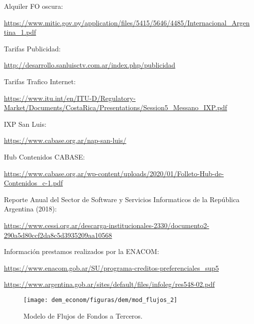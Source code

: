 





\begin{thebibliography}{99}
 Alquiler FO oscura: \begin{tiny}
\url{https://www.mitic.gov.py/application/files/5415/5646/4485/Internacional_Argentina_1.pdf}
\end{tiny}

 Tarifas Publicidad: \begin{tiny}
\url{http://desarrollo.sanluisctv.com.ar/index.php/publicidad}
\end{tiny}

 Tarifas Trafico Internet: \begin{tiny}
\url{https://www.itu.int/en/ITU-D/Regulatory-Market/Documents/CostaRica/Presentations/Session5_Messano_IXP.pdf}
\end{tiny}

 IXP San Luis:
\begin{tiny}
\url{https://www.cabase.org.ar/nap-san-luis/}
\end{tiny}

 Hub Contenidos CABASE:
\begin{tiny}
\url{https://www.cabase.org.ar/wp-content/uploads/2020/01/Folleto-Hub-de-Contenidos_c-1.pdf}
\end{tiny}

 Reporte Anual del Sector de Software y Servicios Informaticos de la República Argentina (2018):


\begin{tiny}
\url{https://www.cessi.org.ar/descarga-institucionales-2330/documento2-290a5d80ccf2da8c5d3935209aa10568}
\end{tiny}

 Información prestamos realizados por la ENACOM:

\begin{tiny}
\url{https://www.enacom.gob.ar/SU/programa-creditos-preferenciales_sup5}
\end{tiny}

\begin{tiny}
\url{https://www.argentina.gob.ar/sites/default/files/infoleg/res548-02.pdf}
\end{tiny}


\end{thebibliography}


 \begin{figure}[H]
	 \centering
	 \texttt{[image: dem\_econom/figuras/dem/mod\_flujos\_2]}
	 \caption{Modelo de Flujos de Fondos a Terceros.}
	 \label{dem-figuras:mod_flujos}

 \end{figure}


